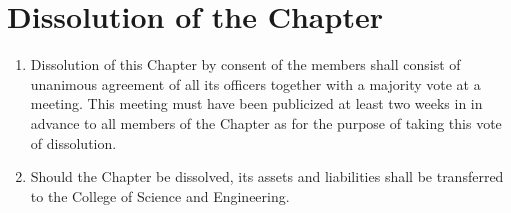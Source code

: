 \documentclass[12pt,letterpaper]{article}
\begin{document}
\section{Dissolution of the Chapter}
\begin{enumerate}
  \item Dissolution of this Chapter by consent of the members shall consist of
        unanimous agreement of all its officers together with a majority vote at a
        meeting. This meeting must have been publicized at least two weeks in in
        advance to all members of the Chapter as for the purpose of taking this vote
        of dissolution.
  \item Should the Chapter be dissolved, its assets and liabilities shall be
        transferred to the College of Science and Engineering.
\end{enumerate}
\end{document}
